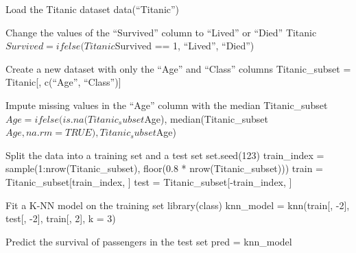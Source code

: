 \documentclass[
  ignorenonframetext,
]{beamer}
\begin{document}
\begin{frame}{Load the Titanic dataset}
\protect\hypertarget{load-the-titanic-dataset}{}
data(``Titanic'')
\end{frame}

\begin{frame}{Change the values of the ``Survived'' column to ``Lived''
or ``Died''}
\protect\hypertarget{change-the-values-of-the-survived-column-to-lived-or-died}{}
Titanic\(Survived = ifelse(Titanic\)Survived == 1, ``Lived'', ``Died'')
\end{frame}

\begin{frame}{Create a new dataset with only the ``Age'' and ``Class''
columns}
\protect\hypertarget{create-a-new-dataset-with-only-the-age-and-class-columns}{}
Titanic\_subset = Titanic{[}, c(``Age'', ``Class''){]}
\end{frame}

\begin{frame}{Impute missing values in the ``Age'' column with the
median}
\protect\hypertarget{impute-missing-values-in-the-age-column-with-the-median}{}
Titanic\_subset\(Age = ifelse(is.na(Titanic_subset\)Age),
median(Titanic\_subset\(Age, na.rm = TRUE), Titanic_subset\)Age)
\end{frame}

\begin{frame}{Split the data into a training set and a test set}
\protect\hypertarget{split-the-data-into-a-training-set-and-a-test-set}{}
set.seed(123) train\_index = sample(1:nrow(Titanic\_subset), floor(0.8 *
nrow(Titanic\_subset))) train = Titanic\_subset{[}train\_index, {]} test
= Titanic\_subset{[}-train\_index, {]}
\end{frame}

\begin{frame}{Fit a K-NN model on the training set}
\protect\hypertarget{fit-a-k-nn-model-on-the-training-set}{}
library(class) knn\_model = knn(train{[}, -2{]}, test{[}, -2{]},
train{[}, 2{]}, k = 3)
\end{frame}

\begin{frame}{Predict the survival of passengers in the test set}
\protect\hypertarget{predict-the-survival-of-passengers-in-the-test-set}{}
pred = knn\_model
\end{frame}
\end{document}
